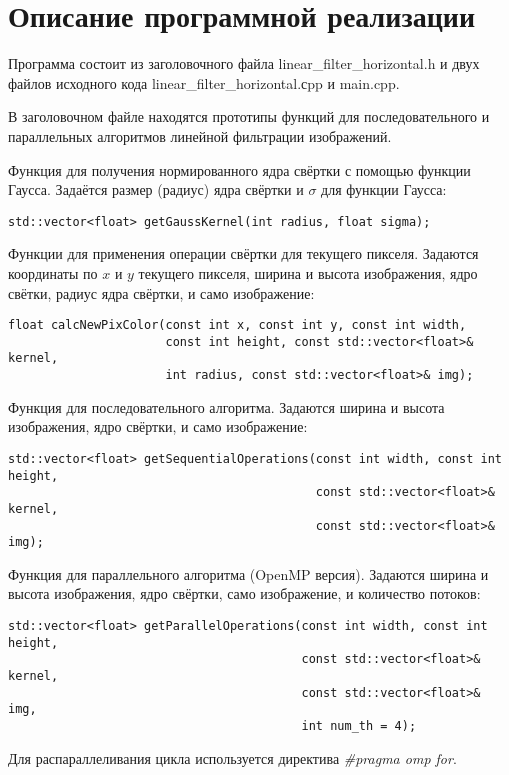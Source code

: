 \documentclass{report}
\begin{document}
\section*{Описание программной реализации}
Программа состоит из заголовочного файла linear\_filter\_horizontal.h и двух файлов исходного кода linear\_filter\_horizontal.сpp и main.cpp.
\par В заголовочном файле находятся прототипы функций для последовательного и параллельных алгоритмов линейной фильтрации изображений.
\par Функция для получения нормированного ядра свёртки с помощью функции Гаусса. Задаётся размер (радиус) ядра свёртки и $\sigma$ для функции Гаусса:
\begin{lstlisting}
std::vector<float> getGaussKernel(int radius, float sigma);
\end{lstlisting}
\par Функции для применения операции свёртки для текущего пикселя. Задаются координаты по $x$ и $y$ текущего пикселя, ширина и высота изображения, ядро свётки, радиус ядра свёртки, и само изображение:
\begin{lstlisting}
float calcNewPixColor(const int x, const int y, const int width,
					  const int height, const std::vector<float>& kernel,
                      int radius, const std::vector<float>& img);
\end{lstlisting}
\par Функция для последовательного алгоритма. Задаются ширина и высота изображения, ядро свёртки, и само изображение:
\begin{lstlisting}
std::vector<float> getSequentialOperations(const int width, const int height,
                                           const std::vector<float>& kernel,
                                           const std::vector<float>& img);
\end{lstlisting}
\par Функция для параллельного алгоритма (OpenMP версия). Задаются ширина и высота изображения, ядро свёртки, само изображение, и количество потоков:
\begin{lstlisting}
std::vector<float> getParallelOperations(const int width, const int height,
                                         const std::vector<float>& kernel,
                                         const std::vector<float>& img,
                                         int num_th = 4);
\end{lstlisting}
Для распараллеливания цикла используется директива \textit{\#pragma omp for}.
\end{document}
